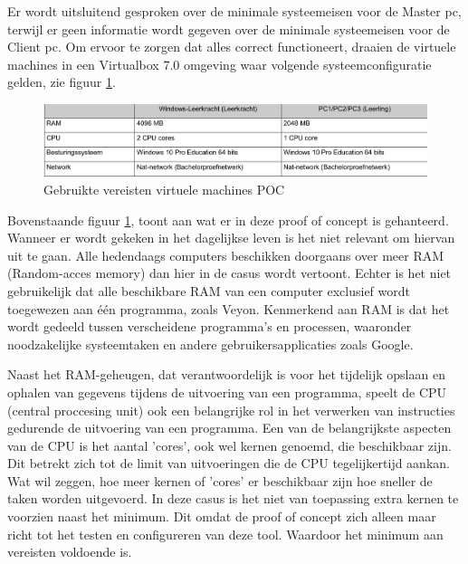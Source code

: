 Er wordt uitsluitend gesproken over de minimale systeemeisen voor de Master pc, terwijl er geen informatie wordt gegeven over de minimale systeemeisen voor de Client pc. Om ervoor te zorgen dat alles correct functioneert, draaien de virtuele machines in een Virtualbox 7.0 omgeving waar volgende systeemconfiguratie gelden, zie figuur \ref{fig:Vereisten virtuele machines POC}. 

\begin{figure}[h]
     \centering
     \includegraphics[width=1\textwidth]{graphics/vereisten.png}
     \caption{Gebruikte vereisten virtuele machines POC}
     \label{fig:Vereisten virtuele machines POC} 
\end{figure}

Bovenstaande figuur \ref{fig:Vereisten virtuele machines POC}, toont aan wat er in deze proof of concept is gehanteerd. Wanneer er wordt gekeken in het dagelijkse leven is het niet relevant om hiervan uit te gaan. Alle hedendaags computers beschikken doorgaans over meer RAM (Random-acces memory) dan hier in de casus wordt vertoont. Echter is het niet gebruikelijk dat alle beschikbare RAM van een computer exclusief wordt toegewezen aan één programma, zoals Veyon. Kenmerkend aan RAM is dat het wordt gedeeld tussen verscheidene programma's en processen, waaronder noodzakelijke systeemtaken en andere gebruikersapplicaties zoals Google.

Naast het RAM-geheugen, dat verantwoordelijk is voor het tijdelijk opslaan en ophalen van gegevens tijdens de uitvoering van een programma, speelt de CPU (central proccesing unit) ook een belangrijke rol in het verwerken van instructies gedurende de uitvoering van een programma. Een van de belangrijkste aspecten van de CPU is het aantal 'cores', ook wel kernen genoemd, die beschikbaar zijn. Dit betrekt zich tot de limit van uitvoeringen die de CPU tegelijkertijd aankan. Wat wil zeggen, hoe meer kernen of 'cores' er beschikbaar zijn hoe sneller de taken worden uitgevoerd. In deze casus is het niet van toepassing extra kernen te voorzien naast het minimum. Dit omdat de proof of concept zich alleen maar richt tot het testen en configureren van deze tool. Waardoor het minimum aan vereisten voldoende is.\newline

